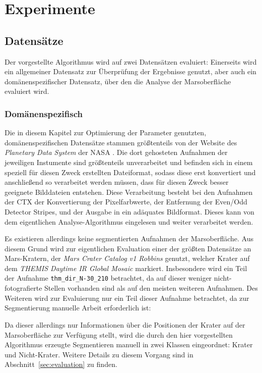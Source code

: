 \chapter{Experimente}
\label{chap:experiments}

\section{Datensätze}
\label{sec:datasets}

Der vorgestellte Algorithmus wird auf zwei Datensätzen evaluiert: Einerseits wird ein allgemeiner Datensatz zur Überprüfung der Ergebnisse genutzt, aber auch ein domänenspezifischer Datensatz, über den die Analyse der Marsoberfläche evaluiert wird. 

\subsection{Domänenspezifisch}
\label{ssec:dataset_domain}

Die in diesem Kapitel zur Optimierung der Parameter genutzten, domänenspezifischen Datensätze stammen größtenteils von der Website des \textit{Planetary Data System} der NASA \cite{pds}. Die dort gehosteten Aufnahmen der jeweiligen Instumente sind größtenteils unverarbeitet und befinden sich in einem speziell für diesen Zweck erstellten Dateiformat, sodass diese erst konvertiert und anschließend so verarbeitet werden müssen, dass für diesen Zweck besser geeignete Bilddateien entstehen.
Diese Verarbeitung besteht bei den Aufnahmen der CTX der Konvertierung der Pixelfarbwerte, der Entfernung der Even/Odd Detector Stripes, und der Ausgabe in ein adäquates Bildformat. Dieses kann von dem eigentlichen Analyse-Algorithmus eingelesen und weiter verarbeitet werden.

Es existieren allerdings keine segmentierten Aufnahmen der Marsoberfläche. Aus diesem Grund wird zur eigentlichen Evaluation einer der größten Datensätze an Mars-Kratern, der \textit{Mars Crater Catalog v1 Robbins} \cite{robbins_12} genutzt, welcher Krater auf dem \textit{THEMIS Daytime IR Global Mosaic} markiert. Insbesondere wird ein Teil der Aufnahme \texttt{thm\_dir\_N-30\_210} betrachtet, da auf dieser weniger nicht-fotografierte Stellen vorhanden sind als auf den meisten weiteren Aufnahmen. Des Weiteren wird zur Evaluierung nur ein Teil dieser Aufnahme betrachtet, da zur Segmentierung manuelle Arbeit erforderlich ist:

Da dieser allerdings nur Informationen über die Positionen der Krater auf der Marsoberfläche zur Verfügung stellt, wird die durch den hier vorgestellten Algorithmus erzeugte Segmentieren manuell in zwei Klassen eingeordnet: Krater und Nicht-Krater. Weitere Details zu diesem Vorgang sind in Abschnitt~\ref{sec:evaluation} zu finden.

